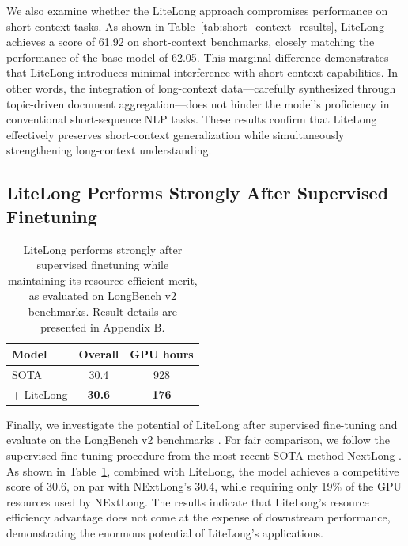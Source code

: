 \documentclass{article}
\theoremstyle{plain}
\theoremstyle{definition}
\theoremstyle{remark}
\begin{document}
    We also examine whether the LiteLong approach compromises performance on short-context tasks. As shown in Table~\ref{tab:short_context_results}, LiteLong achieves a score of 61.92 on short-context benchmarks, closely matching the performance of the base model of 62.05. This marginal difference demonstrates that LiteLong introduces minimal interference with short-context capabilities. In other words, the integration of long-context data---carefully synthesized through topic-driven document aggregation---does not hinder the model's proficiency in conventional short-sequence NLP tasks. These results confirm that LiteLong effectively preserves short-context generalization while simultaneously strengthening long-context understanding.


\subsection{LiteLong Performs Strongly After Supervised Finetuning}  

    \begin{table}[tbp]
        \centering
        \small
        \begin{tabular}{lcc}
        \toprule
        \textbf{Model} & \textbf{Overall} & \textbf{GPU hours} \\
        \midrule
        SOTA & 30.4 & 928\\
        + LiteLong & \textbf{30.6} & \textbf{176} \\
        \bottomrule
        \end{tabular}
        \caption{ LiteLong performs strongly after supervised finetuning while maintaining its resource-efficient merit, as evaluated on LongBench v2 benchmarks. Result details are presented in Appendix B.}
        \label{tab:sft_results}
    \end{table}

    Finally, we investigate the potential of LiteLong after supervised fine-tuning and evaluate on the LongBench v2 benchmarks \cite{bai2024longbench}. For fair comparison, we follow the supervised fine-tuning procedure from the most recent SOTA method NextLong \cite{gao2025nextlong}. As shown in Table~\ref{tab:sft_results}, combined with LiteLong, the model achieves a competitive score of 30.6, on par with NExtLong’s 30.4, while requiring only 19\% of the GPU resources used by NExtLong. The results indicate that LiteLong's resource efficiency advantage does not come at the expense of downstream performance, demonstrating the enormous potential of LiteLong's applications.
    
\end{document}

